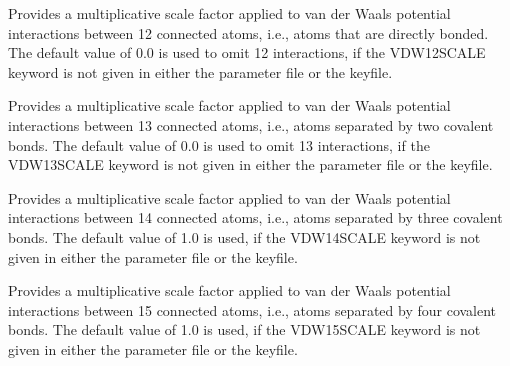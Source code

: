 \documentclass[letterpaper,11pt,english]{sphinxmanual}
\begin{document}
\ignorespaces {}\label{\detokenize{text/keywords:key-vdw-12-scale}}\begin{description}
\sphinxAtStartPar
Provides a multiplicative scale factor applied to van der Waals potential interactions between 1\sphinxhyphen{}2 connected atoms, i.e., atoms that are directly bonded. The default value of 0.0 is used to omit 1\sphinxhyphen{}2 interactions, if the VDW\sphinxhyphen{}12\sphinxhyphen{}SCALE keyword is not given in either the parameter file or the keyfile.

\end{description}

\ignorespaces {}\label{\detokenize{text/keywords:key-vdw-13-scale}}\begin{description}
\sphinxAtStartPar
Provides a multiplicative scale factor applied to van der Waals potential interactions between 1\sphinxhyphen{}3 connected atoms, i.e., atoms separated by two covalent bonds. The default value of 0.0 is used to omit 1\sphinxhyphen{}3 interactions, if the VDW\sphinxhyphen{}13\sphinxhyphen{}SCALE keyword is not given in either the parameter file or the keyfile.

\end{description}

\ignorespaces {}\label{\detokenize{text/keywords:key-vdw-14-scale}}\begin{description}
\sphinxAtStartPar
Provides a multiplicative scale factor applied to van der Waals potential interactions between 1\sphinxhyphen{}4 connected atoms, i.e., atoms separated by three covalent bonds. The default value of 1.0 is used, if the VDW\sphinxhyphen{}14\sphinxhyphen{}SCALE keyword is not given in either the parameter file or the keyfile.

\end{description}

\ignorespaces {}\label{\detokenize{text/keywords:key-vdw-15-scale}}\begin{description}
\sphinxAtStartPar
Provides a multiplicative scale factor applied to van der Waals potential interactions between 1\sphinxhyphen{}5 connected atoms, i.e., atoms separated by four covalent bonds. The default value of 1.0 is used, if the VDW\sphinxhyphen{}15\sphinxhyphen{}SCALE keyword is not given in either the parameter file or the keyfile.

\end{description}
\end{document}
